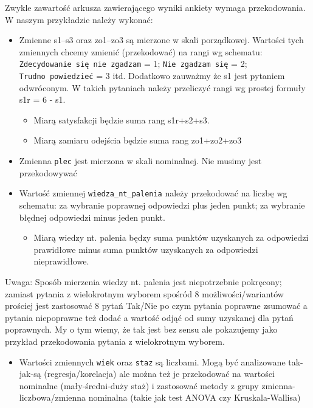 \documentclass[
  openany]{book}
\providecommand{\tightlist}{%
  \setlength{\itemsep}{0pt}\setlength{\parskip}{0pt}}
\begin{document}
Zwykle zawartość arkusza zawierającego wyniki ankiety wymaga przekodowania.
W naszym przykładzie należy wykonać:

\begin{itemize}
\item
  Zmienne s1--s3 oraz zo1--zo3 są mierzone w skali porządkowej. Wartości tych zmiennych
  chcemy zmienić (przekodować) na rangi wg schematu: \texttt{Zdecydowanie\ się\ nie\ zgadzam} = 1;
  \texttt{Nie\ zgadzam\ się} = 2; \texttt{Trudno\ powiedzieć} = 3 itd.
  Dodatkowo zauważmy że s1 jest pytaniem odwróconym.
  W takich pytaniach należy przeliczyć rangi wg prostej formuły s1r = 6 - s1.

  \begin{itemize}
  \tightlist
  \item
    Miarą satysfakcji będzie suma rang s1r+s2+s3.
  \item
    Miarą zamiaru odejścia będzie suma rang zo1+zo2+zo3
  \end{itemize}
\item
  Zmienna \texttt{plec} jest mierzona w skali nominalnej. Nie musimy jest przekodowywać
\item
  Wartość zmiennej \texttt{wiedza\_nt\_palenia} należy przekodować na liczbę wg schematu:
  za wybranie poprawnej odpowiedzi plus jeden punkt; za wybranie błędnej odpowiedzi
  minus jeden punkt.

  \begin{itemize}
  \tightlist
  \item
    Miarą wiedzy nt. palenia będzy suma punktów uzyskanych za odpowiedzi prawidłowe
    minus suma punktów uzyskanych za odpowiedzi nieprawidłowe.
  \end{itemize}
\end{itemize}

Uwaga: Sposób mierzenia wiedzy nt. palenia jest niepotrzebnie pokręcony; zamiast
pytania z wielokrotnym wyborem spośród 8 możliwości/wariantów prościej jest zastosować
8 pytań Tak/Nie po czym pytania poprawne zsumować
a pytania niepoprawne też dodać a wartość odjąć od sumy uzyskanej dla pytań poprawnych.
My o tym wiemy, że tak jest bez sensu ale pokazujemy jako przykład przekodowania
pytania z wielokrotnym wyborem.

\begin{itemize}
\tightlist
\item
  Wartości zmiennych \texttt{wiek} oraz \texttt{staz} są liczbami. Mogą być analizowane tak-jak-są
  (regresja/korelacja) ale można też je przekodować na wartości nominalne
  (mały-średni-duży staż) i zastosować metody z grupy zmienna-liczbowa/zmienna nominalna
  (takie jak test ANOVA czy Kruskala-Wallisa)
\end{itemize}
\end{document}
